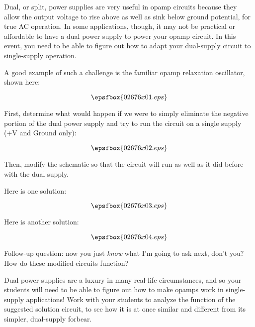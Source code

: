 

Dual, or split, power supplies are very useful in opamp circuits because they allow the output voltage to rise above as well as sink below ground potential, for true AC operation.  In some applications, though, it may not be practical or affordable to have a dual power supply to power your opamp circuit.  In this event, you need to be able to figure out how to adapt your dual-supply circuit to single-supply operation.

A good example of such a challenge is the familiar opamp relaxation oscillator, shown here:

$$\epsfbox{02676x01.eps}$$

First, determine what would happen if we were to simply eliminate the negative portion of the dual power supply and try to run the circuit on a single supply (+V and Ground only):

$$\epsfbox{02676x02.eps}$$

Then, modify the schematic so that the circuit will run as well as it did before with the dual supply.







Here is one solution:

$$\epsfbox{02676x03.eps}$$

Here is another solution:

$$\epsfbox{02676x04.eps}$$

\vskip 10pt

Follow-up question: now you just {\it know} what I'm going to ask next, don't you?  How do these modified circuits function?







Dual power supplies are a luxury in many real-life circumstances, and so your students will need to be able to figure out how to make opamps work in single-supply applications!  Work with your students to analyze the function of the suggested solution circuit, to see how it is at once similar and different from its simpler, dual-supply forbear.




